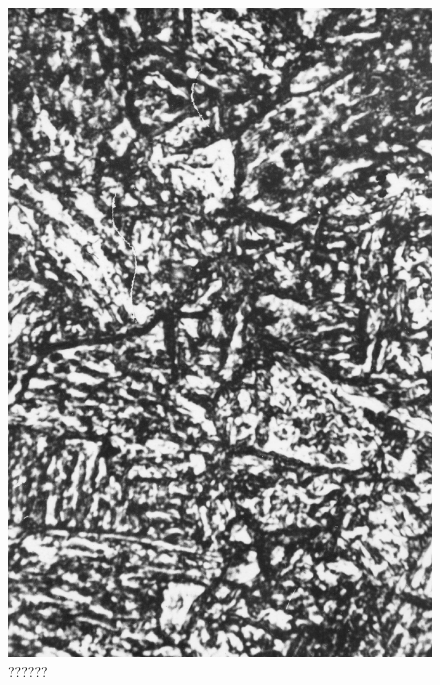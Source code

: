 \begin{figure}[H]
\renewcommand{\thefigure}{22A}
\includegraphics[scale=0.75]{images/chapter-4/fig022A.jpg}
\caption{??????}\label{chapter-4-fig22A}
\end{figure}

\newpage

